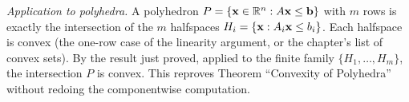 \emph{Application to polyhedra.} A polyhedron $P = \{\mathbf{x} \in \mathbb{R}^n : A\mathbf{x} \leq \mathbf{b}\}$ with $m$ rows is exactly the intersection of the $m$ halfspaces $H_i = \{\mathbf{x} : A_i \mathbf{x} \leq b_i\}$. Each halfspace is convex (the one-row case of the linearity argument, or the chapter's list of convex sets). By the result just proved, applied to the finite family $\{H_1, \dots, H_m\}$, the intersection $P$ is convex. This reproves Theorem ``Convexity of Polyhedra'' without redoing the componentwise computation.
